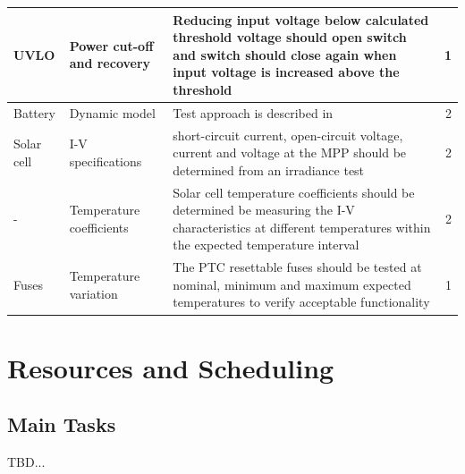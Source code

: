 \begin{center}
\begin{longtable}[H]{p{}p{}p{}r}
\hline
\ac{UVLO} & Power cut-off and recovery & Reducing input voltage below calculated threshold voltage should open switch and switch should close again when input voltage is increased above the threshold & 1\\
\hline
Battery & Dynamic model & Test approach is described in \cite{chen} & 2\\
\hline
Solar cell & I-V specifications & short-circuit current, open-circuit voltage, current and voltage at the \ac{MPP} should be determined from an irradiance test & 2\\
- & Temperature coefficients & Solar cell temperature coefficients should be determined be measuring the I-V characteristics at different temperatures within the expected temperature interval & 2\\
\hline
Fuses & Temperature variation & The \ac{PTC} resettable fuses should be tested at nominal, minimum and maximum expected temperatures to verify acceptable functionality & 1\\
\hline
\end{longtable}
\end{center}
%

\section{Resources and Scheduling}
\label{sec:resources_scheduling}

\subsection{Main Tasks}

TBD...

